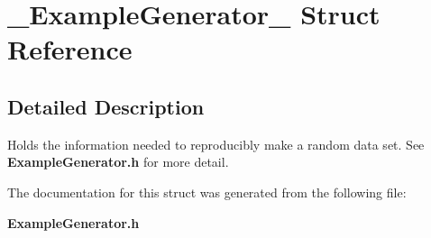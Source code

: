 \section{\_\-Example\-Generator\_\- Struct Reference}
\label{struct__ExampleGenerator__}


\subsection{Detailed Description}
Holds the information needed to reproducibly make a random data set. See {\bf Example\-Generator.h} for more detail. 



The documentation for this struct was generated from the following file:\begin{CompactItemize}
\item 
{\bf Example\-Generator.h}\end{CompactItemize}

